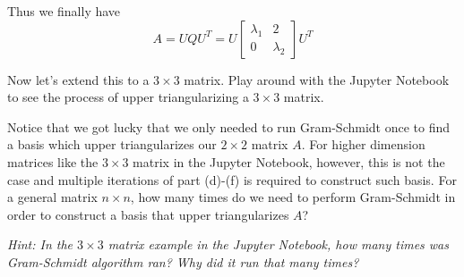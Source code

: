 \begin{enumerate}
{        Thus we finally have
        \[
        A =  UQU^T = U \begin{bmatrix}
            \lambda_1 &  2\\
            0 &  \lambda_2 \end{bmatrix}  U^T
        \]
    }

    \qitem Now let's extend this to a $3\times3$ matrix. Play around with the Jupyter Notebook to see the process of 
    upper triangularizing a $3\times3$ matrix.  

    \ws{
    \vspace{150px}
    }






    \qitem Notice that we got lucky that we only needed to run Gram-Schmidt once to find a basis which 
    upper triangularizes our $2\times2$ matrix $A$. For higher dimension matrices like the $3\times3$ matrix in the Jupyter Notebook, 
    however, this is not the case  and multiple iterations of part (d)-(f) is required to construct such basis. 
    For a general matrix $n\times n$,  how many times do we need to perform Gram-Schmidt in order to 
    construct a basis that upper triangularizes $A$? 

    \textit{Hint: In the $3\times3$ matrix example in the Jupyter Notebook, how many times was Gram-Schmidt algorithm ran?
    Why did it run that many times?}


\end{enumerate}
